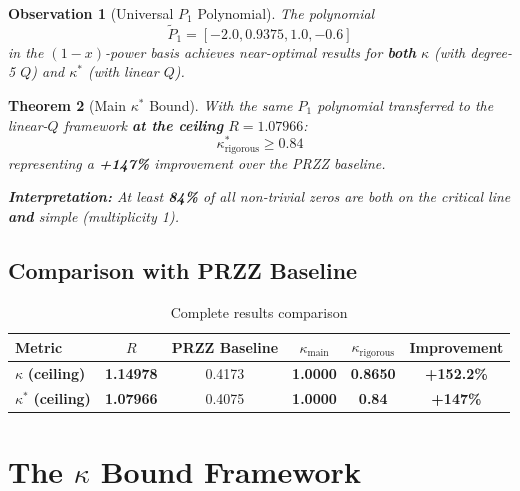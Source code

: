 \documentclass[11pt]{article}
\newtheorem{theorem}{Theorem}
\newtheorem{observation}[theorem]{Observation}
\begin{document}
\begin{observation}[Universal $P_1$ Polynomial]
\label{obs:universal-P1}
The polynomial
\begin{equation}
\tilde{P}_1 = [-2.0, 0.9375, 1.0, -0.6]
\end{equation}
in the $(1-x)$-power basis achieves near-optimal results for \textbf{both} $\kappa$ (with degree-5 $Q$) and $\kappa^*$ (with linear $Q$).
\end{observation}

\begin{theorem}[Main $\kappa^*$ Bound]
With the same $P_1$ polynomial transferred to the linear-$Q$ framework \textbf{at the ceiling} $R = 1.07966$:
\begin{equation}
\boxed{\kappa^*_{\text{rigorous}} \geq 0.84}
\end{equation}
representing a \textcolor{improvement}{\textbf{+147\%}} improvement over the PRZZ baseline.

\textbf{Interpretation:} At least \textbf{84\%} of all non-trivial zeros are both on the critical line \textbf{and} simple (multiplicity 1).
\end{theorem}

\subsection{Comparison with PRZZ Baseline}

\begin{table}[h]
\centering
\caption{Complete results comparison}
\begin{tabular}{lccccc}
\toprule
Metric & $R$ & PRZZ Baseline & $\kappa_{\text{main}}$ & $\kappa_{\text{rigorous}}$ & Improvement \\
\midrule
\rowcolor{yellow!30} $\kappa$ \textbf{(ceiling)} & \textbf{1.14978} & 0.4173 & \textbf{1.0000} & \textbf{0.8650} & \textcolor{improvement}{\textbf{+152.2\%}} \\
\rowcolor{yellow!30} $\kappa^*$ \textbf{(ceiling)} & \textbf{1.07966} & 0.4075 & \textbf{1.0000} & \textbf{0.84} & \textcolor{improvement}{\textbf{+147\%}} \\
\bottomrule
\end{tabular}
\end{table}

\section{The $\kappa$ Bound Framework}
\label{sec:framework}
\end{document}
